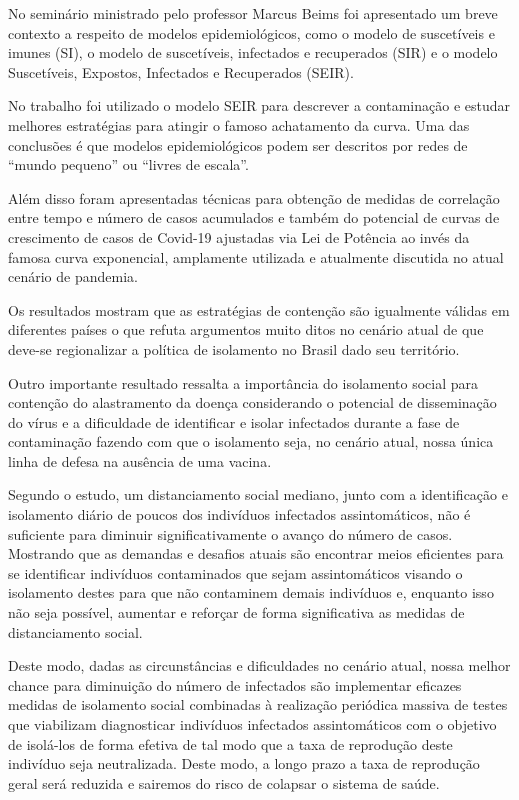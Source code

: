 \documentclass[
	12pt,				%
	openright,			%
	twoside,			%
	a4paper,			%
	english,			%
	brazil,				%
	svgnames
	]{abntex2}\usepackage[]{graphicx}\usepackage[]{color}
\begin{document}
No seminário ministrado pelo professor Marcus Beims foi apresentado um breve contexto a respeito de modelos epidemiológicos, como o modelo de suscetíveis e imunes (SI), o modelo de suscetíveis, infectados e recuperados (SIR) e o modelo Suscetíveis, Expostos, Infectados e Recuperados (SEIR).

No trabalho foi utilizado o modelo SEIR para descrever a contaminação e estudar melhores estratégias para atingir o famoso achatamento da curva. Uma das conclusões é que modelos epidemiológicos podem ser descritos por redes de “mundo pequeno” ou “livres de escala”. 

Além disso foram apresentadas técnicas para obtenção de medidas de correlação entre tempo e número de casos acumulados e também do potencial de curvas de crescimento de casos de Covid-19 ajustadas via Lei de Potência ao invés da famosa curva exponencial, amplamente utilizada e atualmente discutida no atual cenário de pandemia.
 
Os resultados mostram que as estratégias de contenção são igualmente válidas em diferentes países o que refuta argumentos muito ditos no cenário atual de que deve-se regionalizar a política de isolamento no Brasil dado seu território.

Outro importante resultado ressalta a importância do isolamento social para contenção do alastramento da doença considerando o potencial de disseminação do vírus e a dificuldade de identificar e isolar infectados durante a fase de contaminação fazendo com que o isolamento seja, no cenário atual, nossa única linha de defesa na ausência de uma vacina.

Segundo o estudo, um distanciamento social mediano, junto com a identificação e isolamento diário de poucos dos indivíduos infectados assintomáticos, não é suficiente para diminuir significativamente o avanço do número de casos. Mostrando que as demandas e desafios atuais são encontrar meios eficientes para se identificar indivíduos contaminados que sejam assintomáticos visando o isolamento destes para que não contaminem demais indivíduos e, enquanto isso não seja possível, aumentar e reforçar de forma significativa as medidas de distanciamento social. 

Deste modo, dadas as circunstâncias e dificuldades no cenário atual, nossa melhor chance para diminuição do número de infectados são implementar eficazes medidas de isolamento social combinadas à realização periódica massiva de testes que viabilizam diagnosticar indivíduos infectados assintomáticos com o objetivo de isolá-los de forma efetiva de tal modo que a taxa de reprodução deste indivíduo seja neutralizada. Deste modo, a longo prazo a taxa de reprodução geral será reduzida e sairemos do risco de colapsar o sistema de saúde. 
\end{document}
